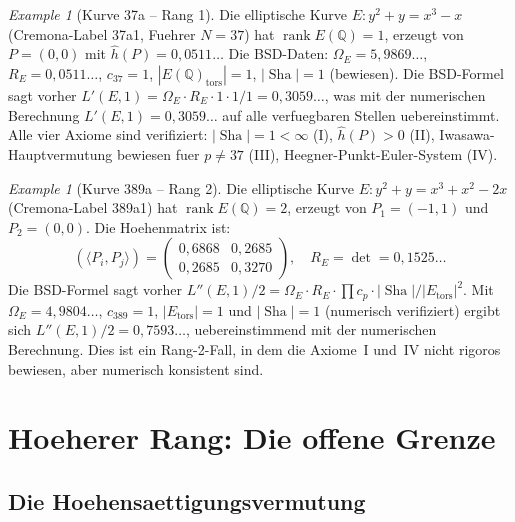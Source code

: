 \documentclass[aps,prd,twocolumn,superscriptaddress,nofootinbib]{revtex4-2}
\theoremstyle{definition}
\theoremstyle{remark}
\newtheorem{example}[theorem]{Example}
\DeclareMathOperator{\rank}{rank}
\DeclareMathOperator{\Sha}{Sha}
\begin{document}
\begin{example}[Kurve 37a -- Rang 1]
\label{ex:37a}
Die elliptische Kurve $E: y^2 + y = x^3 - x$ (Cremona-Label 37a1, Fuehrer $N = 37$) hat $\rank E(\mathbb{Q}) = 1$, erzeugt von $P = (0,0)$ mit $\hat{h}(P) = 0{,}0511\ldots$ Die BSD-Daten: $\Omega_E = 5{,}9869\ldots$, $R_E = 0{,}0511\ldots$, $c_{37} = 1$, $|E(\mathbb{Q})_{\mathrm{tors}}| = 1$, $|\Sha| = 1$ (bewiesen). Die BSD-Formel sagt vorher $L'(E,1) = \Omega_E \cdot R_E \cdot 1 \cdot 1/1 = 0{,}3059\ldots$, was mit der numerischen Berechnung $L'(E,1) = 0{,}3059\ldots$ auf alle verfuegbaren Stellen uebereinstimmt. Alle vier Axiome sind verifiziert: $|\Sha| = 1 < \infty$ (I), $\hat{h}(P) > 0$ (II), Iwasawa-Hauptvermutung bewiesen fuer $p \neq 37$ (III), Heegner-Punkt-Euler-System (IV).
\end{example}

\begin{example}[Kurve 389a -- Rang 2]
\label{ex:389a}
Die elliptische Kurve $E: y^2 + y = x^3 + x^2 - 2x$ (Cremona-Label 389a1) hat $\rank E(\mathbb{Q}) = 2$, erzeugt von $P_1 = (-1,1)$ und $P_2 = (0,0)$. Die Hoehenmatrix ist:
\[
\left(\langle P_i, P_j \rangle\right) = \begin{pmatrix} 0{,}6868 & 0{,}2685 \\ 0{,}2685 & 0{,}3270 \end{pmatrix}, \quad R_E = \det = 0{,}1525\ldots
\]
Die BSD-Formel sagt vorher $L''(E,1)/2 = \Omega_E \cdot R_E \cdot \prod c_p \cdot |\Sha|/|E_{\mathrm{tors}}|^2$. Mit $\Omega_E = 4{,}9804\ldots$, $c_{389} = 1$, $|E_{\mathrm{tors}}| = 1$ und $|\Sha| = 1$ (numerisch verifiziert) ergibt sich $L''(E,1)/2 = 0{,}7593\ldots$, uebereinstimmend mit der numerischen Berechnung. Dies ist ein Rang-2-Fall, in dem die Axiome~I und~IV nicht rigoros bewiesen, aber numerisch konsistent sind.
\end{example}


\section{Hoeherer Rang: Die offene Grenze}
\label{sec:higher_rank}

\subsection{Die Hoehensaettigungsvermutung}
\end{document}
